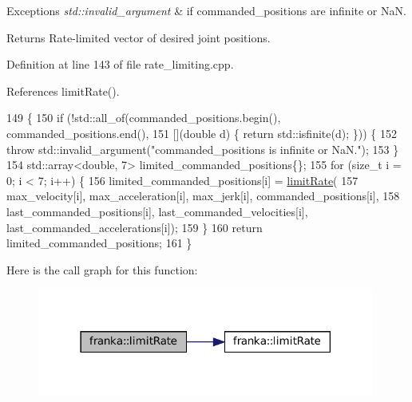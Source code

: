 \begin{DoxyExceptions}{Exceptions}
{\em std\+::invalid\+\_\+argument} & if commanded\+\_\+positions are infinite or NaN.\\
\hline
\end{DoxyExceptions}
\begin{DoxyReturn}{Returns}
Rate-\/limited vector of desired joint positions. 
\end{DoxyReturn}


Definition at line 143 of file rate\+\_\+limiting.\+cpp.



References limit\+Rate().


\begin{DoxyCode}
149                                                                                          \{
150   \textcolor{keywordflow}{if} (!std::all\_of(commanded\_positions.begin(), commanded\_positions.end(),
151                    [](\textcolor{keywordtype}{double} d) \{ \textcolor{keywordflow}{return} std::isfinite(d); \})) \{
152     \textcolor{keywordflow}{throw} std::invalid\_argument(\textcolor{stringliteral}{"commanded\_positions is infinite or NaN."});
153   \}
154   std::array<double, 7> limited\_commanded\_positions\{\};
155   \textcolor{keywordflow}{for} (\textcolor{keywordtype}{size\_t} i = 0; i < 7; i++) \{
156     limited\_commanded\_positions[i] = \hyperlink{namespacefranka_1_1anonymous__namespace_02rate__limiting_8cpp_03_aa1d64bbd7b303af83e6a76b92298d73a}{limitRate}(
157         max\_velocity[i], max\_acceleration[i], max\_jerk[i], commanded\_positions[i],
158         last\_commanded\_positions[i], last\_commanded\_velocities[i], last\_commanded\_accelerations[i]);
159   \}
160   \textcolor{keywordflow}{return} limited\_commanded\_positions;
161 \}
\end{DoxyCode}
Here is the call graph for this function\+:
\nopagebreak
\begin{figure}[H]
\begin{center}
\leavevmode
\includegraphics[width=314pt]{namespacefranka_ac6ebb1c79c15c7d00a2fa621a968d622_cgraph}
\end{center}
\end{figure}
\mbox{\label{namespacefranka_a7f2f3179adc4b960bde0a44ab1cc4fcc}} 
